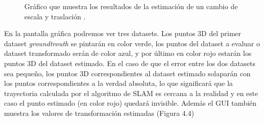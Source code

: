 \begin{figure}[H]
\begin{center}
\hspace{0.5cm}

\end{center}

\caption{Gráfico que muestra los resultados de la estimación de un cambio de escala y traslación .}
\end{figure}

En la pantalla gráfica podremos ver tres datasets. Los puntos 3D del primer dataset \textit{groundtrouth} se pintarán en color verde, los puntos del dataset a evaluar o dataset transformado serán de color azul, y por último en color rojo estarán los puntos 3D del dataset estimado.
En el caso de que el error entre los dos datasets sea pequeño, los puntos 3D correspondientes al dataset estimado solaparán con los puntos correspondientes a la verdad absoluta, lo que significará que la trayectoria calculada por el algoritmo de SLAM es cercana a la realidad y en este caso el punto estimado (en color rojo) quedará invisible. Además el GUI también muestra los valores de transformación estimadas (Figura 4.4)



